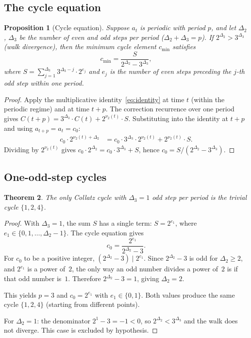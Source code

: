\documentclass[manuscript]{aomart}
\theoremstyle{plain}
\newtheorem{theorem}{Theorem}[section]
\newtheorem{proposition}[theorem]{Proposition}
\theoremstyle{definition}
\theoremstyle{remark}
\numberwithin{equation}{section}
\begin{document}
\subsection{The cycle equation}

\begin{proposition}[Cycle equation]\label{prop:cycle-eq}
Suppose $a_t$ is periodic with period $p$, and let $\Delta_2$,
$\Delta_3$ be the number of even and odd steps per period
($\Delta_2 + \Delta_3 = p$).  If $2^{\Delta_2} > 3^{\Delta_3}$
(walk divergence), then the minimum cycle element $c_{\min}$
satisfies
\begin{equation}\label{eq:cycle}
  c_{\min} = \frac{S}{2^{\Delta_2} - 3^{\Delta_3}},
\end{equation}
where $S = \sum_{j=1}^{\Delta_3} 3^{\Delta_3-j} \cdot 2^{e_j}$ and
$e_j$ is the number of even steps preceding the $j$-th odd step
within one period.
\end{proposition}

\begin{proof}
Apply the multiplicative identity~\eqref{eq:identity} at time $t$
(within the periodic regime) and at time $t + p$.  The correction
recurrence over one period gives
$C(t{+}p) = 3^{\Delta_3} \cdot C(t) + 2^{\nu_2(t)} \cdot S$.
Substituting into the identity at $t + p$ and using
$a_{t+p} = a_t = c_0$:
\begin{align*}
  c_0 \cdot 2^{\nu_2(t) + \Delta_2}
  &= c_0 \cdot 3^{\Delta_3} \cdot 2^{\nu_2(t)} + 2^{\nu_2(t)} \cdot S.
\end{align*}
Dividing by $2^{\nu_2(t)}$ gives
$c_0 \cdot 2^{\Delta_2} = c_0 \cdot 3^{\Delta_3} + S$,
hence $c_0 = S/(2^{\Delta_2} - 3^{\Delta_3})$.
\end{proof}

\subsection{One-odd-step cycles}

\begin{theorem}\label{thm:one-odd}
The only Collatz cycle with $\Delta_3 = 1$ odd step per period is the
trivial cycle $\{1, 2, 4\}$.
\end{theorem}

\begin{proof}
With $\Delta_3 = 1$, the sum $S$ has a single term: $S = 2^{e_1}$,
where $e_1 \in \{0, 1, \ldots, \Delta_2 - 1\}$.  The cycle equation
gives
\[
  c_0 = \frac{2^{e_1}}{2^{\Delta_2} - 3}.
\]
For $c_0$ to be a positive integer, $(2^{\Delta_2} - 3) \mid 2^{e_1}$.
Since $2^{\Delta_2} - 3$ is odd for $\Delta_2 \ge 2$, and $2^{e_1}$
is a power of~$2$, the only way an odd number divides a power of~$2$
is if that odd number is~$1$.  Therefore $2^{\Delta_2} - 3 = 1$,
giving $\Delta_2 = 2$.

This yields $p = 3$ and $c_0 = 2^{e_1}$ with $e_1 \in \{0, 1\}$.
Both values produce the same cycle $\{1, 2, 4\}$ (starting from
different points).

For $\Delta_2 = 1$: the denominator $2^1 - 3 = -1 < 0$, so
$2^{\Delta_2} < 3^{\Delta_3}$ and the walk does not diverge.  This
case is excluded by hypothesis.
\end{proof}
\end{document}
